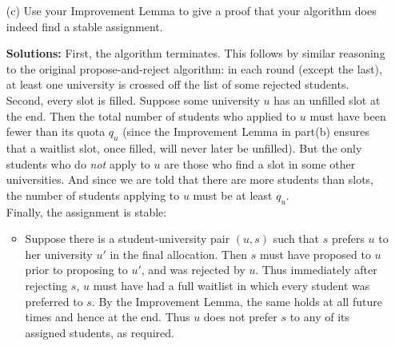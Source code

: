 \documentclass[11pt]{article}
\newif\ifsolutions
\begin{document}
\begin{qunlist}
\begin{itemize}
\ifsolutions
\textbf{Solutions:}
\begin{itemize}
\item[Improvement Lemma] Assume that universities maintain their waitlist in decreasing order of
their preference for the students on the lists.
For any university $u$, let $q_u$ be its quota and let $s_i^k \in \{Students\}\cup\{\oplus\}$
be the student in the $i$'th position on the waitlist after the $k$'th round of the algorithm.
(If there are fewer than $q_u$ students on the list, we fill the bottom of the list with $\oplus$'s.)
Then for all $i$ and $k$, $s_i^k \geq s_i^{k-1}$. 
(Here we assume that the university prefers any student to $\oplus$.)
\end{itemize}
In short, the lemma says that no position in the list ever gets worse for the university as the algorithm proceeds.
To prove the lemma, consider some university $u$, index $i \leq q_u$ and a day $k \geq 2$.\\
Consider $u$'s waitlist on day $k-1$, from the algorithm, 
since no student who is in one of the top $i \leq q_u$ spots in the waitlist are rejected on day $k-1$,
they are all still on the waitlist on day $k$; 
and thus on day $k$, 
$u$ can populate the top $i$ spots with candidates at least as good as those on day $k-1$,
proving the lemma.
\fi

\item[(c)] Use your Improvement Lemma to give a proof that your algorithm does indeed find a stable assignment.

\ifsolutions
\textbf{Solutions:} First, the algorithm terminates. 
This follows by similar reasoning to the original propose-and-reject algorithm:
in each round (except the last), at least one university is crossed off the list of some rejected students. \\
Second, every slot is filled. Suppose some university $u$ has an unfilled slot at the end.
Then the total number of students who applied to $u$ must have been fewer than its quota $q_u$ 
(since the Improvement Lemma in part(b) ensures that a waitlist slot, once filled, will never later be unfilled).
But the only students who do \textit{not} apply to $u$ are those who find a slot in some other universities.
And since we are told that there are more students than slots, 
the number of students applying to $u$ must be at least $q_u$. \\
Finally, the assignment is stable:
\begin{itemize}
\item Suppose there is a student-university pair $(u,s)$ such that 
$s$ prefers $u$ to her university $u'$ in the final allocation.
Then $s$ must have proposed to $u$ prior to proposing to $u'$, and was rejected by $u$.
Thus immediately after rejecting $s$, 
$u$ must have had a full waitlist in which every student was preferred to $s$.
By the Improvement Lemma, the same holds at all future times and hence at the end.
Thus $u$ does not prefer $s$ to any of its assigned students, as required.


\end{itemize}
\end{itemize}
\end{qunlist}
\end{document}
